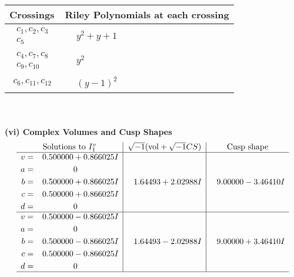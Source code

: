 \documentclass[1p]{elsarticle_modified}
\theoremstyle{definition}
\newcommand{\I}{\sqrt{-1}}
\begin{document}
\begin{tabular}{m{50pt}|m{274pt}}
Crossings & \hspace{64pt}Riley Polynomials at each crossing \\
\hline $$\begin{aligned}c_{1},c_{2},c_{3}\\c_{5}\end{aligned}$$&$\begin{aligned}
&y^2+y+1
\end{aligned}$\\
\hline $$\begin{aligned}c_{4},c_{7},c_{8}\\c_{9},c_{10}\end{aligned}$$&$\begin{aligned}
&y^2
\end{aligned}$\\
\hline $$\begin{aligned}c_{6},c_{11},c_{12}\end{aligned}$$&$\begin{aligned}
&(y-1)^2
\end{aligned}$\\
\hline
\end{tabular}\\~\\
\newpage\flushleft \textbf{(vi) Complex Volumes and Cusp Shapes}
$$\begin{array}{c|c|c}  
\text{Solutions to }I^v_{1}& \I (\text{vol} + \sqrt{-1}CS) & \text{Cusp shape}\\
 \hline 
\begin{aligned}
v &= \phantom{-}0.500000 + 0.866025 I \\
a &= \phantom{-0.000000 } 0 \\
b &= \phantom{-}0.500000 + 0.866025 I \\
c &= \phantom{-}0.500000 + 0.866025 I \\
d &= \phantom{-0.000000 } 0\end{aligned}
 & \phantom{-}1.64493 + 2.02988 I & \phantom{-}9.00000 - 3.46410 I \\ \hline\begin{aligned}
v &= \phantom{-}0.500000 - 0.866025 I \\
a &= \phantom{-0.000000 } 0 \\
b &= \phantom{-}0.500000 - 0.866025 I \\
c &= \phantom{-}0.500000 - 0.866025 I \\
d &= \phantom{-0.000000 } 0\end{aligned}
 & \phantom{-}1.64493 - 2.02988 I & \phantom{-}9.00000 + 3.46410 I\\
 \hline 
 \end{array}$$\newpage\newpage\renewcommand{\arraystretch}{1}
\end{document}
